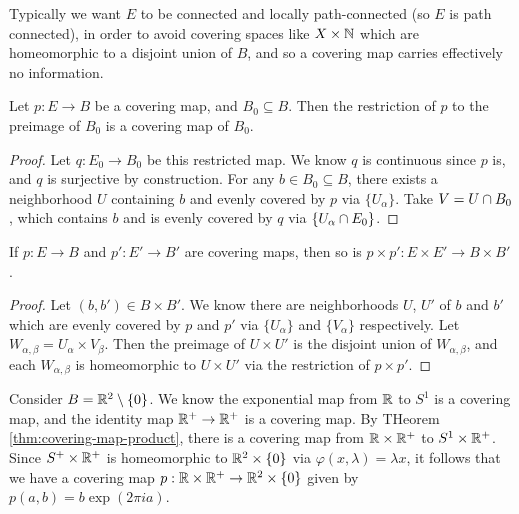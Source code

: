 \begin{rmk}
    Typically we want $E$ to be connected and locally path-connected (so $E$ is path connected), in order to avoid covering spaces like $X \times \mathbb{N}$ which are homeomorphic to a disjoint union of $B$, and so a covering map carries effectively no information.
\end{rmk}

\begin{thm}
    Let $p: E \to B$ be a covering map, and $B_{0} \subseteq B$. Then the restriction of $p$ to the preimage of $B_{0}$ is a covering map of $B_{0}$.
\end{thm}

\begin{proof}
    Let $q: E_{0} \to B_{0}$ be this restricted map. We know $q$ is continuous since $p$ is, and $q$ is surjective by construction. For any $b \in B_{0} \subseteq B$, there exists a neighborhood $U$ containing $b$ and evenly covered by $p$ via $\{U_{\alpha}\}$. Take $V = U \cap B_0$, which contains $b$ and is evenly covered by $q$ via $\{U_{\alpha} \cap E_{0}\}$.
\end{proof}

\begin{thm}\label{thm:covering-map-product}
    If $p: E \to B$ and $p': E' \to B'$ are covering maps, then so is $p \times p': E \times E' \to B \times B'$.
\end{thm}

\begin{proof}
    Let $(b, b') \in B \times B'$. We know there are neighborhoods $U$, $U'$ of $b$ and $b'$ which are evenly covered by $p$ and $p'$ via $\{U_{\alpha}\}$ and $\{V_{\alpha}\}$ respectively. Let $W_{\alpha,\beta} = U_{\alpha} \times V_{\beta}$. Then the preimage of $U \times U'$ is the disjoint union of $W_{\alpha,\beta}$, and each $W_{\alpha,\beta}$ is homeomorphic to $U \times U'$ via the restriction of $p \times p'$.
\end{proof}

\begin{exmp}
    Consider $B = \mathbb{R}^2 \setminus \{0\}$. We know the exponential map from $\mathbb{R}$ to $S^1$ is a covering map, and the identity map $\mathbb{R}^+ \to \mathbb{R}^+$ is a covering map. By THeorem \ref{thm:covering-map-product}, there is a covering map from $\mathbb{R} \times \mathbb{R}^+$ to $S^1 \times \mathbb{R}^+$. Since $S^+ \times \mathbb{R}^+$ is homeomorphic to $\mathbb{R}^2 \times \{0\}$ via $\varphi(x, \lambda) = \lambda x$, it follows that we have a covering map $p: \mathbb{R} \times \mathbb{R}^+ \to \mathbb{R}^2 \times \{0\}$ given by $p(a, b) = b\exp(2\pi i a)$.
\end{exmp}

